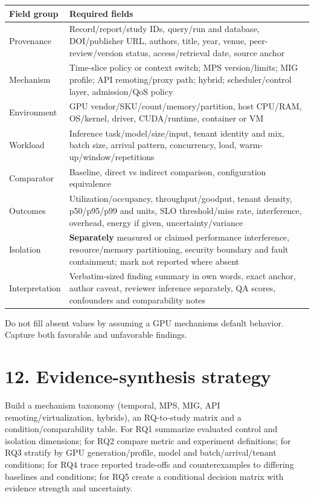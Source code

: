 \documentclass[
  12pt,
]{article}
\begin{document}
\begin{longtable}[]{@{}p{}p{}@{}}
\toprule\noalign{}
Field group & Required fields \\
\midrule\noalign{}
\endhead
\bottomrule\noalign{}
\endlastfoot
Provenance & Record/report/study IDs, query/run and database,
DOI/publisher URL, authors, title, year, venue, peer-review/version
status, access/retrieval date, source anchor \\
Mechanism & Time-slice policy or context switch; MPS version/limits; MIG
profile; API remoting/proxy path; hybrid; scheduler/control layer,
admission/QoS policy \\
Environment & GPU vendor/SKU/count/memory/partition, host CPU/RAM,
OS/kernel, driver, CUDA/runtime, container or VM \\
Workload & Inference task/model/size/input, tenant identity and mix,
batch size, arrival pattern, concurrency, load,
warm-up/window/repetitions \\
Comparator & Baseline, direct vs indirect comparison, configuration
equivalence \\
Outcomes & Utilization/occupancy, throughput/goodput, tenant density,
p50/p95/p99 and units, SLO threshold/miss rate, interference, overhead,
energy if given, uncertainty/variance \\
Isolation & \textbf{Separately} measured or claimed performance
interference, resource/memory partitioning, security boundary and fault
containment; mark not reported where absent \\
Interpretation & Verbatim-sized finding summary in own words, exact
anchor, author caveat, reviewer inference separately, QA scores,
confounders and comparability notes \\
\end{longtable}

Do not fill absent values by assuming a GPU mechanism\textquotesingle s
default behavior. Capture both favorable and unfavorable findings.

\hypertarget{12-evidence-synthesis-strategy}{%
\section{12. Evidence-synthesis
strategy}\label{12-evidence-synthesis-strategy}}

Build a mechanism taxonomy (temporal, MPS, MIG, API
remoting/virtualization, hybrids), an RQ-to-study matrix and a
condition/comparability table. For RQ1 summarize evaluated control and
isolation dimensions; for RQ2 compare metric and experiment definitions;
for RQ3 stratify by GPU generation/profile, model and
batch/arrival/tenant conditions; for RQ4 trace reported trade-offs and
counterexamples to differing baselines and conditions; for RQ5 create a
conditional decision matrix with evidence strength and uncertainty.
\end{document}
